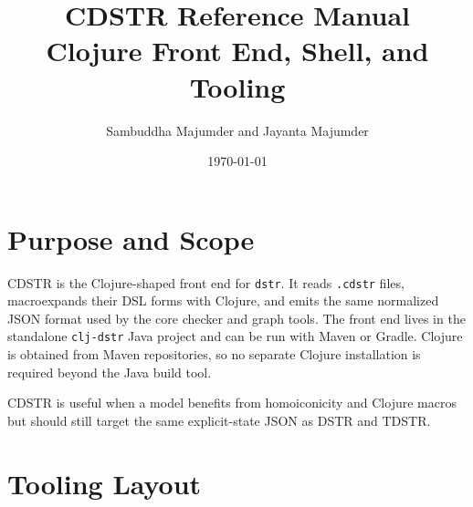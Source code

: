 \documentclass[11pt]{article}
\title{CDSTR Reference Manual\\\large Clojure Front End, Shell, and Tooling}
\author{Sambuddha Majumder and Jayanta Majumder}
\date{\today}
\begin{document}
\maketitle
\tableofcontents

\section{Purpose and Scope}

CDSTR is the Clojure-shaped front end for \texttt{dstr}.  It reads
\texttt{.cdstr} files, macroexpands their DSL forms with Clojure, and emits the
same normalized JSON format used by the core checker and graph tools.  The
front end lives in the standalone \texttt{clj-dstr} Java project and can be run
with Maven or Gradle.  Clojure is obtained from Maven repositories, so no
separate Clojure installation is required beyond the Java build tool.

CDSTR is useful when a model benefits from homoiconicity and Clojure macros but
should still target the same explicit-state JSON as DSTR and TDSTR.

\section{Tooling Layout}
\end{document}
